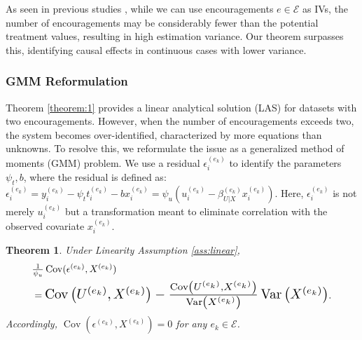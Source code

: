 \documentclass[journal]{IEEEtran}
\newtheorem{theorem}{Theorem}
\newcommand*{\Scale}[2][4]{\scalebox{#1}{$#2$}}
\begin{document}
As seen in previous studies \cite{newey2003instrumental,pearl2009causality,imbens2015causal}, while we can use encouragements $e \in \mathcal{E}$ as IVs, the number of encouragements may be considerably fewer than the potential treatment values, resulting in high estimation variance. Our theorem surpasses this, identifying causal effects in continuous cases with lower variance. 


\subsubsection{GMM Reformulation}

Theorem \ref{theorem:1} provides a linear analytical solution (LAS) for datasets with two encouragements. However, when the number of encouragements exceeds two, the system becomes over-identified, characterized by more equations than unknowns. To resolve this, we reformulate the issue as a generalized method of moments (GMM) problem. We use a residual $\epsilon_i^{(e_k)}$ to identify the parameters ${\psi_t, b}$, where the residual is defined as:
$
\epsilon_i^{(e_k)} =  y_i^{(e_k)} - \psi_t t_i^{(e_k)} - b x_i^{(e_k)} 
 =  
\psi_u (u_i^{(e_k)} - \beta_{U|X}^{(e_k)} x_i^{(e_k)})$. Here, $\epsilon_i^{(e_k)}$ is not merely $u_i^{(e_k)}$ but a transformation meant to eliminate correlation with the observed covariate $x_i^{(e_k)}$.

\begin{theorem}\label{theorem:2}
Under Linearity Assumption \ref{ass:linear}, \\
\begin{equation}
    \begin{aligned}
    &  \Scale[1.0]{\frac{1}{\psi_u} \operatorname{Cov}(\epsilon^{(e_k)} , X^{(e_k)} )}
    \\ & = 
    \resizebox{0.84\linewidth}{!}{$\operatorname{Cov}\left(U^{(e_k)}, X^{(e_k)}\right) - \frac{\operatorname{Cov}\left(U^{(e_k)}, X^{(e_k)}\right)}{\operatorname{Var}\left(X^{(e_k)}\right)}\operatorname{Var}\left(X^{(e_k)}\right)$}.
     \end{aligned}
    \end{equation} 
Accordingly, $\operatorname{Cov}(\epsilon^{(e_k)} , X^{(e_k)} ) = 0$ for any $e_k \in \mathcal{E}$.
\end{theorem} 
\end{document}
